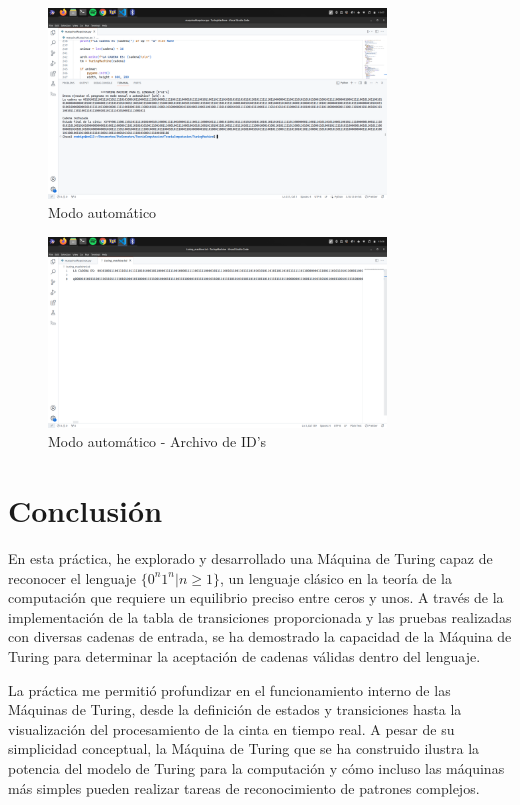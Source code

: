 \documentclass[11pt]{article} %
\begin{document}
	\newpage
		\begin{figure}[h]
		\centering
		\includegraphics[width=0.8\textwidth]{auto}
		\caption{Modo automático}
	\end{figure}
	\begin{figure}[h]
		\centering
		\includegraphics[width=0.8\textwidth]{arch3}
		\caption{Modo automático - Archivo de ID's}
	\end{figure}
	

	
	
	
	\newpage
	\section*{Conclusión}
	
	En esta práctica, he explorado y desarrollado una Máquina de Turing capaz de reconocer el lenguaje \( \{0^n1^n | n \geq 1\} \), un lenguaje clásico en la teoría de la computación que requiere un equilibrio preciso entre ceros y unos. A través de la implementación de la tabla de transiciones proporcionada y las pruebas realizadas con diversas cadenas de entrada, se ha demostrado la capacidad de la Máquina de Turing para determinar la aceptación de cadenas válidas dentro del lenguaje.
	
	La práctica me permitió profundizar en el funcionamiento interno de las Máquinas de Turing, desde la definición de estados y transiciones hasta la visualización del procesamiento de la cinta en tiempo real. A pesar de su simplicidad conceptual, la Máquina de Turing que se ha construido ilustra la potencia del modelo de Turing para la computación y cómo incluso las máquinas más simples pueden realizar tareas de reconocimiento de patrones complejos.
	
\end{document}
